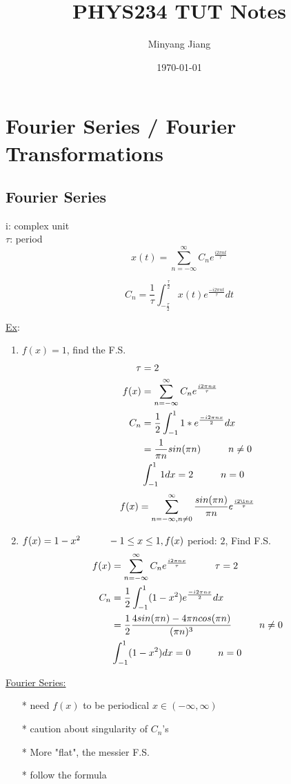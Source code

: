 \documentclass[12pt, a4paper]{article}
\title{\huge PHYS234 TUT Notes}
\author{Minyang Jiang}
\date{\today}
\newcommand{\NP}{\newpage \vspace*{-0.4in}}
\newcommand{\tab}[1][1cm]{\hspace*{#1}}
\begin{document}
\maketitle
\NP
\section{Fourier Series / Fourier Transformations}
\subsection{Fourier Series}
i: complex unit\\
$\tau$: period
\begin{equation}
x(t)=\sum_{n=-\infty}^{\infty}C_ne^{\frac{i2\pi nt}{\tau}}
\end{equation}

\begin{equation}
C_n = \frac{1}{\tau}\int_{-\frac{\tau}{2}}^{\frac{\tau}{2}}x(t)e^{\frac{-i2\pi n t}{\tau}}dt
\end{equation}

\underline{Ex}:\\
\begin{enumerate}
\item
$f(x) = 1$, find the F.S.
\begin{align*}
\tau&= 2\\
f(x)& = \sum_{n=-\infty}^{\infty}C_ne^{\frac{i2\pi nx}{\tau}}\\
C_n&=\frac{1}{2}\int_{-1}^{1} 1* e^{\frac{-i2\pi n x}{2}}dx\\
&= \frac{1}{\pi n}sin(\pi n) \tab n\neq 0\\
&\int_{-1}^11dx=2 \tab n =0
\end{align*}
$$f(x) = \sum_{n=-\infty, n\neq 0}^{\infty} \frac{sin(\pi n)}{\pi n}e^{\frac{i2 \i nx}{\tau}}$$
\item 
$f(x)=1-x^2 \tab -1 \leq x\leq 1, f(x)$ period: $2$, Find F.S.
\begin{align*}
f(x)& = \sum_{n=-\infty}^{\infty}C_ne^{\frac{i2\pi nx}{\tau}} \tab \tau= 2\\
C_n&=\frac{1}{2}\int_{-1}^{1} (1-x^2) e^{\frac{-i2\pi n x}{2}}dx\\
&=\frac{1}{2}\frac{4sin(\pi n)-4\pi n cos(\pi n)}{(\pi n)^3} \tab n\neq 0\\
&\int_{-1}^1(1-x^2)dx=0 \tab n=0
\end{align*}
\end{enumerate}
\underline{Fourier Series:}
\begin{enumerate}
\item[*] need $f(x)$ to be periodical $x \in (-\infty, \infty)$
\item[*] caution about singularity of $C_n$'s
\item[*] More "flat", the messier F.S.
\item[*] follow the formula
\end{enumerate}
\end{document}
